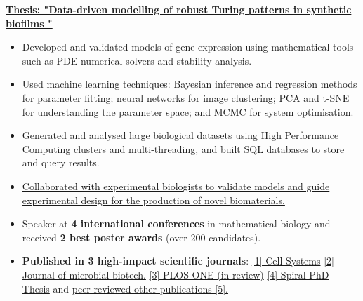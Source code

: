 \documentclass[10pt,a4paper,ragged2e,withhyper]{altacv}
\begin{document}
\begin{paracol}{2}

\href{https://github.com/martinaoliver/PhD_handover/blob/main/PhD_thesis.pdf}{\textbf{Thesis: "Data-driven modelling of robust Turing patterns in synthetic biofilms \faLink"}}
\begin{itemize}
\item Developed and validated models of gene expression using mathematical tools such as PDE numerical solvers and stability analysis. 

\item Used machine learning techniques: Bayesian inference and regression methods for parameter fitting; neural networks for image clustering; PCA and t-SNE for understanding the parameter space; and MCMC for system optimisation.

\item Generated and analysed large biological datasets using High Performance Computing clusters and multi-threading, and built SQL databases to store and query results.

\item \href{https://papers.ssrn.com/sol3/papers.cfm?abstract_id=4733248}{Collaborated with experimental biologists to validate models and guide experimental design for the production of novel biomaterials.}

\item Speaker at \textbf{4 international conferences} in mathematical biology and received \textbf{2 best poster awards} (over 200 candidates). 

\item \textbf{Published in 3 high-impact scientific journals}: \faLink \href{https://papers.ssrn.com/sol3/papers.cfm?abstract_id=4733248}{[1] Cell Systems}  
\href{https://doi.org/10.1111/1751-7915.13979}{[2] Journal of microbial biotech.} \href{https://www.biorxiv.org/content/10.1101/2024.09.09.611947v1}  {[3] PLOS ONE (in review)} 
\href{https://github.com/martinaoliver/PhD_handover/blob/main/PhD_thesis.pdf}{[4] Spiral PhD Thesis} and \href{https://www.sciencedirect.com/science/article/pii/S2405471222004367}{peer reviewed other publications [5].} 


\end{itemize}
\vspace{-0.5\baselineskip} %


\end{paracol}
\end{document}
